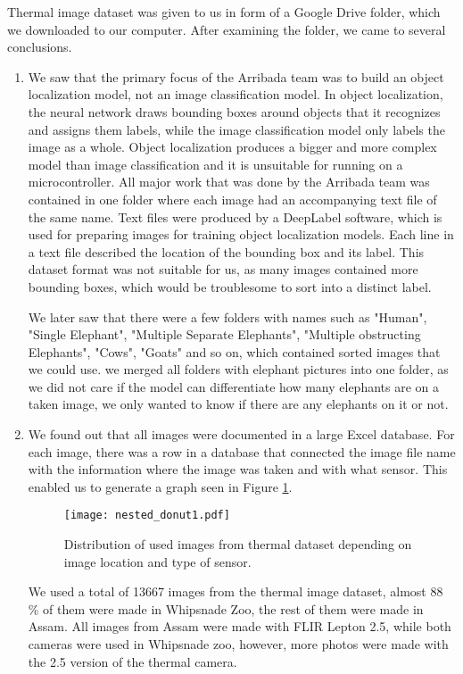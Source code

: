 Thermal image dataset was given to us in form of a Google Drive folder, which we downloaded to our computer.
After examining the folder, we came to several conclusions.

\begin{enumerate}
    \item We saw that the primary focus of the Arribada team was to build an object localization model, not an image classification model.
In object localization, the neural network draws bounding boxes around objects that it recognizes and assigns them labels, while the image classification model only labels the image as a whole.
Object localization produces a bigger and more complex model than image classification and it is unsuitable for running on a microcontroller.
All major work that was done by the Arribada team was contained in one folder where each image had an accompanying text file of the same name.
Text files were produced by a DeepLabel software, which is used for preparing images for training object localization models.
Each line in a text file described the location of the bounding box and its label.
This dataset format was not suitable for us, as many images contained more bounding boxes, which would be troublesome to sort into a distinct label.

We later saw that there were a few folders with names such as "Human", "Single Elephant", "Multiple Separate Elephants", "Multiple obstructing Elephants", "Cows", "Goats" and so on, which contained sorted images that we could use.
we merged all folders with elephant pictures into one folder, as we did not care if the model can differentiate how many elephants are on a taken image, we only wanted to know if there are any elephants on it or not.

    \item We found out that all images were documented in a large Excel database.
For each image, there was a row in a database that connected the image file name with the information where the image was taken and with what sensor.
This enabled us to generate a graph seen in Figure \ref{nested_donut1}.

\begin{figure}[ht]
    \centering
    \texttt{[image: nested\_donut1.pdf]} 
    \caption{Distribution of used images from thermal dataset depending on image location and type of sensor.}
    \label{nested_donut1}
\end{figure}

We used a total of 13667 images from the thermal image dataset, almost 88 \% of them were made in Whipsnade Zoo, the rest of them were made in Assam.
All images from Assam were made with FLIR Lepton 2.5, while both cameras were used in Whipsnade zoo, however, more photos were made with the 2.5 version of the thermal camera.


\end{enumerate}
